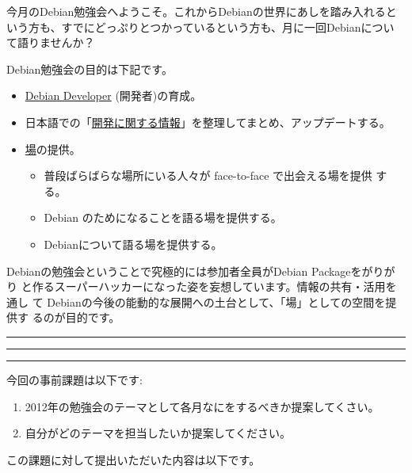 \documentclass[mingoth,a4paper]{jsarticle}
\begin{document}
\begin{multicols}{2}
 

 今月のDebian勉強会へようこそ。これからDebianの世界にあしを踏み入れると
 いう方も、すでにどっぷりとつかっているという方も、月に一回Debianについ
 て語りませんか？

 Debian勉強会の目的は下記です。

 \begin{itemize}
 \item \underline{Debian Developer} (開発者)の育成。
 \item 日本語での「\underline{開発に関する情報}」を整理してまとめ、アップデートする。
 \item \underline{場}の提供。
 \begin{itemize}
  \item 普段ばらばらな場所にいる人々が face-to-face で出会える場を提供
	する。
  \item Debian のためになることを語る場を提供する。
  \item Debianについて語る場を提供する。
 \end{itemize}
 \end{itemize}		

 Debianの勉強会ということで究極的には参加者全員がDebian Packageをがりがり
 と作るスーパーハッカーになった姿を妄想しています。情報の共有・活用を通し
 て Debianの今後の能動的な展開への土台として、「場」としての空間を提供す
 るのが目的です。

\end{multicols}

\newpage

\begin{minipage}[b]{0.2\hsize}
 \colorbox{titleback}{}
\end{minipage}
\begin{minipage}[b]{0.8\hsize}
\hrule
\vspace{2mm}
\hrule
\begin{multicols}{2}
\tableofcontents
\end{multicols}
\vspace{2mm}
\hrule
\end{minipage}


今回の事前課題は以下です:
\begin{enumerate}
 \item 2012年の勉強会のテーマとして各月なにをするべきか提案してくさい。 
 \item 自分がどのテーマを担当したいか提案してください。
\end{enumerate}
この課題に対して提出いただいた内容は以下です。
\begin{multicols}{2}
{\small
% 
}
\end{multicols}
\end{document}
